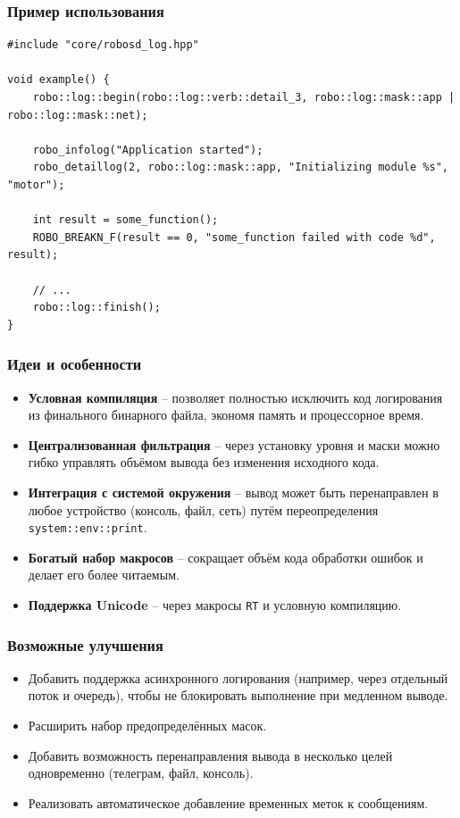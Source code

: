 \documentclass[a4paper,12pt]{article}
\begin{document}
\subsubsection{Пример использования}

\begin{lstlisting}
#include "core/robosd_log.hpp"

void example() {
    robo::log::begin(robo::log::verb::detail_3, robo::log::mask::app | robo::log::mask::net);

    robo_infolog("Application started");
    robo_detaillog(2, robo::log::mask::app, "Initializing module %s", "motor");

    int result = some_function();
    ROBO_BREAKN_F(result == 0, "some_function failed with code %d", result);

    // ...
    robo::log::finish();
}
\end{lstlisting}

\subsubsection{Идеи и особенности}

\begin{itemize}
    \item \textbf{Условная компиляция} -- позволяет полностью исключить код логирования из финального бинарного файла, экономя память и процессорное время.
    \item \textbf{Централизованная фильтрация} -- через установку уровня и маски можно гибко управлять объёмом вывода без изменения исходного кода.
    \item \textbf{Интеграция с системой окружения} -- вывод может быть перенаправлен в любое устройство (консоль, файл, сеть) путём переопределения \texttt{system::env::print}.
    \item \textbf{Богатый набор макросов} -- сокращает объём кода обработки ошибок и делает его более читаемым.
    \item \textbf{Поддержка Unicode} -- через макросы \texttt{RT} и условную компиляцию.
\end{itemize}

\subsubsection{Возможные улучшения}

\begin{itemize}
    \item Добавить поддержка асинхронного логирования (например, через отдельный поток и очередь), чтобы не блокировать выполнение при медленном выводе.
    \item Расширить набор предопределённых масок.
    \item Добавить возможность перенаправления вывода в несколько целей одновременно (телеграм, файл, консоль).
    \item Реализовать автоматическое добавление временных меток к сообщениям.
\end{itemize}
\end{document}

